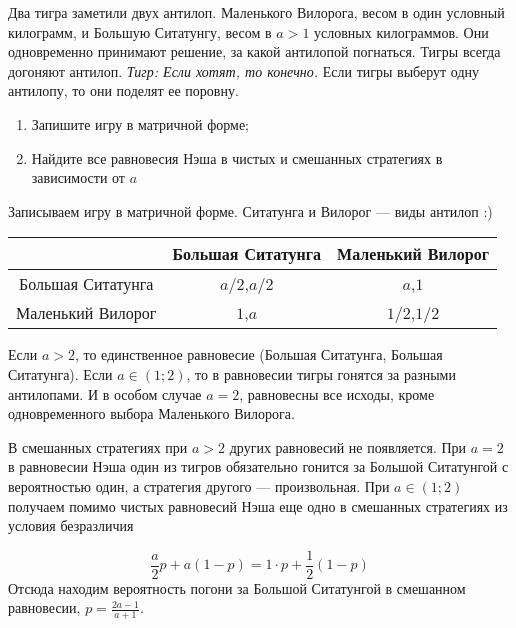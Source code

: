 \begin{problem}
Два тигра заметили двух антилоп. Маленького Вилорога, весом в один условный килограмм, и Большую Ситатунгу, весом в  $a>1$  условных килограммов. Они одновременно принимают решение, за какой антилопой погнаться. Тигры всегда догоняют антилоп. {\it Тигр: Если хотят, то конечно.} Если тигры выберут одну антилопу, то они поделят ее поровну.
\begin{enumerate}
\item  Запишите игру в матричной форме;
\item Найдите все равновесия Нэша в чистых и смешанных стратегиях в зависимости от  $a$
\end{enumerate}


\begin{sol}
Записываем игру в матричной форме. Ситатунга и Вилорог --- виды антилоп :)

\begin{tabular}{c|cc}
 & Большая Ситатунга & Маленький Вилорог \\
\hline
Большая Ситатунга & $a/2$,$a/2$ & $a$,$1$ \\
Маленький Вилорог & $1$,$a$ & $1/2$,$1/2$
\end{tabular}

Если $a>2$, то единственное равновесие (Большая Ситатунга, Большая Ситатунга). Если $a \in (1;2)$, то в равновесии тигры гонятся за разными антилопами. И в особом случае $a=2$, равновесны все исходы, кроме одновременного выбора Маленького Вилорога.

В смешанных стратегиях при $a>2$ других равновесий не появляется. При $a=2$ в равновесии Нэша один из тигров обязательно гонится за Большой Ситатунгой с вероятностью один, а стратегия другого --- произвольная. При $a\in (1;2)$ получаем помимо чистых равновесий Нэша еще одно в смешанных стратегиях из условия безразличия

\[
\frac{a}{2}p+a(1-p)=1\cdot p + \frac{1}{2}(1-p)
\]
Отсюда находим вероятность погони за Большой Ситатунгой в смешанном равновесии, $p=\frac{2a-1}{a+1}$.
\end{sol}
\end{problem}


